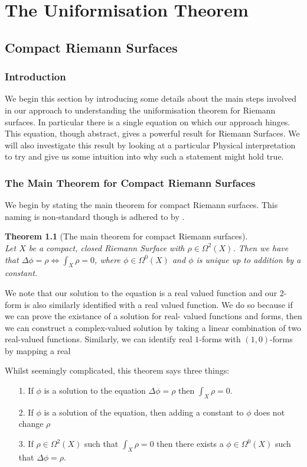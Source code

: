 \documentclass[a4paper,12pt]{report}
\theoremstyle{plain}
\newtheorem{thm}{Theorem}[section]
\theoremstyle{definition}
\begin{document}
\chapter{The Uniformisation Theorem}
\section{Compact Riemann Surfaces}
\subsection{Introduction}
We begin this section by introducing some details about the main steps
involved 
in our approach to understanding the uniformisation theorem for Riemann
surfaces. 
In particular there is a single equation on which our approach hinges.
This 
equation, though abstract, gives a powerful result for Riemann Surfaces.
We will 
also investigate this result by looking at a particular Physical
interpretation 
to try and give us some intuition into why such a statement might hold
true.
\subsection{The Main Theorem for Compact Riemann Surfaces}
We begin by stating the main theorem for compact Riemann surfaces. This
naming is 
non-standard though is adhered to by \cite{donaldson}.
\begin{thm} [The main theorem for compact Riemann surfaces]\label{MTCRS}
~\\
Let $X$ be a compact, closed Riemann Surface with $\rho \in \Omega^2(X)$. 
Then we have that $\Delta \phi = \rho \Leftrightarrow \int_X \rho = 0$,
where $ \phi \in \Omega^0(X)$ and $\phi$ is unique up to addition by a
constant.
\end{thm}
We note that our solution to the equation is a real valued function and
our $2$-form is also similarly identified with a real valued function.
We do so because if we can prove the existance of a solution for real-
valued functions and forms, then we can construct a complex-valued
solution by taking a linear combination of two real-valued functions.
Similarly, we can identify real $1$-forms with $(1,0)$-forms by mapping a
real

Whilst seemingly complicated, this theorem says three things:
\begin{itemize}
\item[1.] If $\phi$ is a solution to the equation $\Delta \phi = \rho$
then $
\int_X \rho = 0$.
\item[2.] If $\phi$ is a solution of the equation, then adding a constant
to $
\phi$ does not change $\rho$
\item[3.] If $\rho \in \Omega^2(X)$ such that $\int_X \rho = 0$ then
there exists 
a $\phi \in \Omega^0(X)$ such that $\Delta \phi = \rho$.
\end{itemize}
\end{document}
